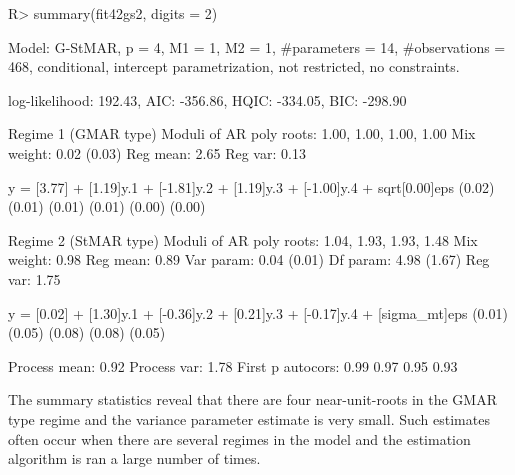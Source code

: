 \documentclass[nojss]{jss} %
\begin{document}
\begin{CodeChunk}
\begin{CodeInput}
R> summary(fit42gs2, digits = 2)
\end{CodeInput}
\begin{CodeOutput}
Model:
 G-StMAR, p = 4, M1 = 1, M2 = 1, #parameters = 14, #observations = 468,
 conditional, intercept parametrization, not restricted, no constraints.

 log-likelihood: 192.43, AIC: -356.86, HQIC: -334.05, BIC: -298.90

Regime 1 (GMAR type)
Moduli of AR poly roots: 1.00, 1.00, 1.00, 1.00
Mix weight: 0.02 (0.03)
Reg mean: 2.65
Reg var:  0.13

y = [3.77] + [1.19]y.1 + [-1.81]y.2 + [1.19]y.3 + [-1.00]y.4 + sqrt[0.00]eps
    (0.02)   (0.01)       (0.01)      (0.01)       (0.00)          (0.00)

Regime 2 (StMAR type)
Moduli of AR poly roots: 1.04, 1.93, 1.93, 1.48
Mix weight: 0.98
Reg mean: 0.89
Var param: 0.04 (0.01)
Df param: 4.98 (1.67)
Reg var:  1.75

y = [0.02] + [1.30]y.1 + [-0.36]y.2 + [0.21]y.3 + [-0.17]y.4 + [sigma_mt]eps
    (0.01)   (0.05)       (0.08)      (0.08)       (0.05)

Process mean: 0.92
Process var:  1.78
First p autocors: 0.99 0.97 0.95 0.93
\end{CodeOutput}
\end{CodeChunk}
%
The summary statistics reveal that there are four near-unit-roots in the GMAR type regime and the variance parameter estimate is very small. Such estimates often occur when there are several regimes in the model and the estimation algorithm is ran a large number of times.
\end{document}
